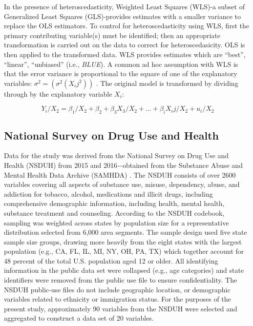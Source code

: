 \documentclass[sigconf]{acmart}
\begin{document}
In the presence of heteroscedasticity, Weighted Least Squares (WLS)-a subset 
of Generalized Least Squares (GLS)-provides estimates with a smaller variance 
to replace the OLS estimators.  To control for heteroscedasticity using WLS, 
first the primary contributing variable(s) must be identified; then an 
appropriate transformation is carried out on the data to correct for 
heteroscedasicity. OLS is then applied to the transformed data. WLS provides 
estimates which are ``best'', ``linear'', ``unbiased'' (i.e., \textit{BLUE}). 
A common ad hoc assumption with WLS is that the error variance is proportional 
to the square of one of the explanatory variables: $\sigma^2=(\sigma^2(X_ij^2))$ 
\cite{gujarati09}. The original model is transformed by dividing through 
by the explanatory variable $X_i$:

\begin{equation}
  \ Y_i/X_2 = \beta_1/X_2 + \beta_2 +\beta_3X_3/X_2 +... + \beta_iX_ij/X_2 + u_i/X_2
\end{equation}


\subsection{National Survey on Drug Use and Health} 

Data for the study was derived from the National Survey on Drug Use and Health 
(NSDUH) from 2015 and 2016$-$obtained from the Substance Abuse and Mental Health 
Data Archive (SAMHDA) \cite{samhsa16}. The NSDUH consists of over 2600 variables 
covering all aspects of substance use, misuse, dependency, abuse, and addiction 
for tobacco, alcohol, medications and illicit drugs, including comprehensive
demographic information, including health, mental health, substance treatment
and counseling. According to the NSDUH codebook, sampling was weighted across 
states by population size for a representative distribution selected from 6,000 
area segments. The sample design used five state sample size groups, drawing more 
heavily from the eight states with the largest population (e.g., CA, FL, IL, MI, 
NY, OH, PA, TX) which together account for 48 percent of the total U.S. population 
aged 12 or older. All identifying information in the public data set were 
collapsed (e.g., age categories) and state identifiers were removed from the public 
use file to ensure confidentiality. The NSDUH public-use files do not include 
geographic location, or demographic variables related to ethnicity or immigration 
status. For the purposes of the present study, approximately 90 variables from the 
NSDUH were selected and aggregated to construct a data set of 20 variables. 
\end{document}
